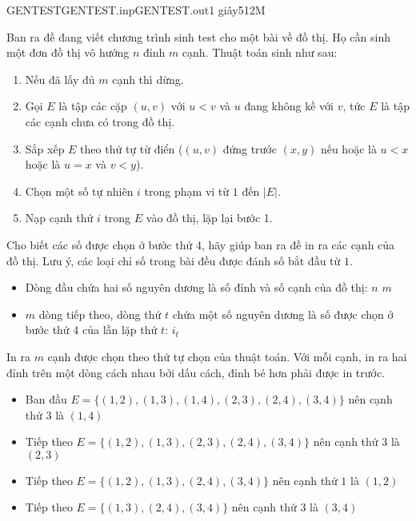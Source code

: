 \begin{problem}{GENTEST}{GENTEST.inp}{GENTEST.out}{1 giây}{512M}
\small{

Ban ra đề đang viết chương trình sinh test cho một bài về đồ thị. Họ cần sinh một đơn đồ thị vô hướng $n$ đỉnh $m$ cạnh. Thuật toán sinh như sau:
\begin{enumerate}
	\item Nếu đã lấy đủ $m$ cạnh thì dừng.
	\item Gọi $E$ là tập các cặp $(u,v)$ với $u<v$ và $u$ đang không kề với $v$, tức $E$ là tập các cạnh chưa có trong đồ thị.
	\item Sắp xếp $E$ theo thứ tự từ điển ($(u,v)$ đứng trước $(x, y)$ nếu hoặc là $u<x$ hoặc là $u=x$ và $v<y$).
	\item Chọn một số tự nhiên $i$ trong phạm vi từ $1$ đến $|E|$.
	\item Nạp cạnh thứ $i$ trong $E$ vào đồ thị, lặp lại bước 1.
\end{enumerate}
Cho biết các số được chọn ở bước thứ 4, hãy giúp ban ra đề in ra các cạnh của đồ thị. Lưu ý, các loại chỉ số trong bài đều được đánh số bắt đầu từ $1$.

\InputFile
\begin{itemize}
	\item Dòng đầu chứa hai số nguyên dương là số đỉnh và số cạnh của đồ thị: $n$ $m$
	\item $m$ dòng tiếp theo, dòng thứ $t$ chứa một số nguyên dương là số được chọn ở bước thứ 4 của lần lặp thứ $t$: $i_t$
\end{itemize}

\OutputFile
In ra $m$ cạnh được chọn theo thứ tự chọn của thuật toán. Với mỗi cạnh, in ra hai đỉnh trên một dòng cách nhau bởi dấu cách, đỉnh bé hơn phải được in trước.

\Examples
\begin{example}%
%
\end{example}
\Explanation
\begin{itemize}
	\item Ban đầu $E = \{(1,2), (1,3), (1,4), (2, 3), (2, 4), (3, 4)\}$ nên cạnh thứ $3$ là $(1, 4)$
	\item Tiếp theo $E = \{(1,2), (1,3), (2, 3), (2, 4), (3, 4)\}$ nên cạnh thứ $3$ là $(2, 3)$
	\item Tiếp theo $E = \{(1,2), (1,3), (2, 4), (3, 4)\}$ nên cạnh thứ $1$ là $(1, 2)$
	\item Tiếp theo $E = \{(1,3), (2, 4), (3, 4)\}$ nên cạnh thứ $3$ là $(3, 4)$
\end{itemize}

}
\end{problem}
